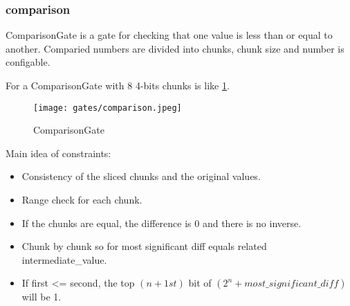\subsubsection{comparison}

ComparisonGate is a gate for checking that one value is less than or equal to another. 
Comparied numbers are divided into chunks, chunk size and number is configable.

For a ComparisonGate with 8 4-bits chunks is like \ref{fig:comparison}.

\begin{figure}[!ht]
    \centering
    \texttt{[image: gates/comparison.jpeg]}
    \caption{ComparisonGate}
    \label{fig:comparison}
\end{figure}

Main idea of constraints:
\begin{itemize}
    \item Consistency of the sliced chunks and the original values.
    \item Range check for each chunk.
    \item If the chunks are equal, the difference is 0 and there is no inverse.
    \item Chunk by chunk so for most significant diff equals related intermediate\_value.
    \item If first <= second, the top $(n + 1st)$ bit of $(2^n + most\_significant\_diff)$ will be 1.
\end{itemize}